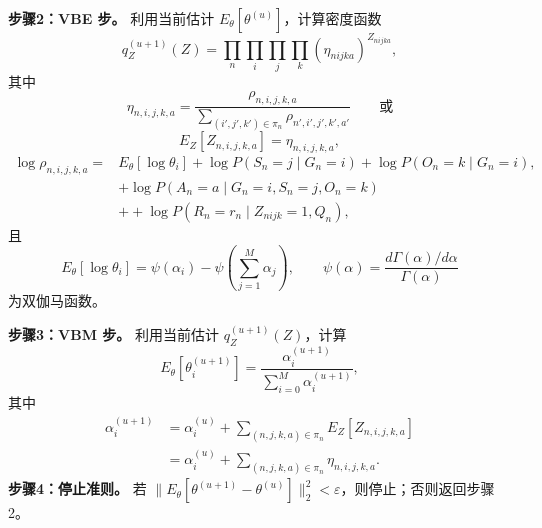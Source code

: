 \noindent\textbf{步骤2：VBE 步。}
利用当前估计 $E_{\theta}[\theta^{(u)}]$，计算密度函数
\begin{equation}
q_Z^{(u+1)}(Z)=\prod_n\prod_i\prod_j\prod_k(\eta_{nijka})^{Z_{nijka}},
\tag{4.38}
\end{equation}
其中
\begin{equation}
\eta_{n,i,j,k,a}=\frac{\rho_{n,i,j,k,a}}
{\sum_{(i',j',k')\in\pi_n}\rho_{n',i',j',k',a'}}\qquad\text{或}
\tag{4.39}
\end{equation}
\[
E_Z[Z_{n,i,j,k,a}]=\eta_{n,i,j,k,a},
\]
\[
\begin{aligned}
\log\rho_{n,i,j,k,a}
={}&E_{\theta}[\log\theta_i]+\log P(S_n=j\mid G_n=i)+\log P(O_n=k\mid G_n=i),\\
&+\log P(A_n=a\mid G_n=i,S_n=j,O_n=k)\\
&+ +\log P(R_n=r_n\mid Z_{nijk}=1,Q_n),
\end{aligned}
\]
且
\[
E_{\theta}[\log\theta_i]=\psi(\alpha_i)-\psi\left(\sum_{j=1}^{M}\alpha_j\right),
\qquad
\psi(\alpha)=\frac{d\Gamma(\alpha)/d\alpha}{\Gamma(\alpha)}
\]
为双伽马函数。

\noindent\textbf{步骤3：VBM 步。}
利用当前估计 $q_Z^{(u+1)}(Z)$，计算
\begin{equation}
E_{\theta}[\theta_i^{(u+1)}]=\frac{\alpha_i^{(u+1)}}{\sum_{i=0}^{M}\alpha_i^{(u+1)}},
\tag{4.40}
\end{equation}
其中
\begin{equation}
\begin{aligned}
\alpha_i^{(u+1)}&=\alpha_i^{(u)}+\sum_{(n,j,k,a)\in\pi_n}E_Z[Z_{n,i,j,k,a}]\\
&=\alpha_i^{(u)}+\sum_{(n,j,k,a)\in\pi_n}\eta_{n,i,j,k,a}.
\end{aligned}
\tag{4.41}
\end{equation}
\noindent\textbf{步骤4：停止准则。}
若 $\lVert E_{\theta}[\theta^{(u+1)}-\theta^{(u)}]\rVert_2^2<\varepsilon$，则停止；否则返回步骤2。
\FloatBarrier
